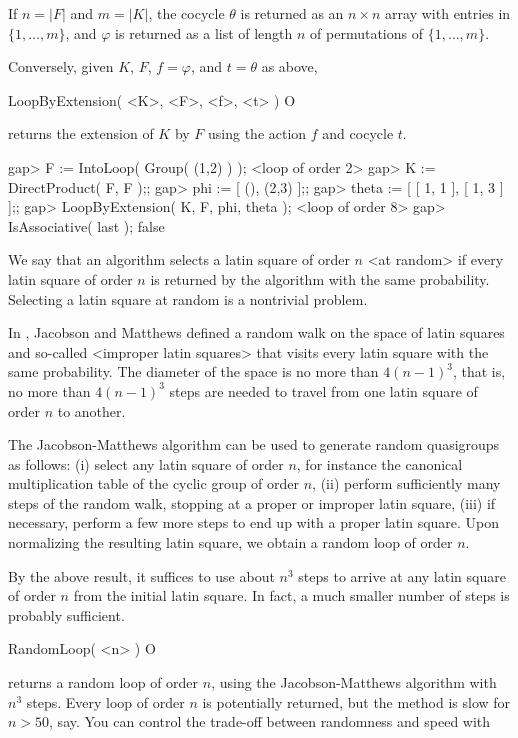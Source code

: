 If $n=|F|$ and $m=|K|$, the cocycle $\theta$ is returned as an $n\times n$
array with entries in $\{1,\dots,m\}$, and $\varphi$ is returned as a list of
length $n$ of permutations of $\{1,\dots,m\}$.

Conversely, given $K$, $F$, $f = \varphi$, and $t = \theta$ as above,

\>LoopByExtension( <K>, <F>, <f>, <t> ) O

returns the extension of $K$ by $F$ using the action $f$ and cocycle $t$.

\beginexample
gap> F := IntoLoop( Group( (1,2) ) );
<loop of order 2>
gap> K := DirectProduct( F, F );;
gap> phi := [ (), (2,3) ];;
gap> theta := [ [ 1, 1 ], [ 1, 3 ] ];;
gap> LoopByExtension( K, F, phi, theta );
<loop of order 8>
gap> IsAssociative( last );
false
\endexample


We say that an algorithm selects a latin square of order $n$ <at
random>\label{random!Latin square} if every latin
square of order $n$ is returned by the algorithm with the same probability.
Selecting a latin square at random is a nontrivial problem.

In \cite{JaMa}, Jacobson and Matthews defined a random walk on the space of
latin squares and so-called <improper latin squares> that visits every latin
square with the same probability. The diameter of the space is no more than
$4(n-1)^3$, that is, no more than $4(n-1)^3$ steps are needed to travel from
one latin square of order $n$ to another.

The Jacobson-Matthews algorithm can be used to generate random quasigroups as
follows: (i) select any latin square of order $n$, for instance the canonical
multiplication table of the cyclic group of order $n$, (ii) perform
sufficiently many steps of the random walk, stopping at a proper or improper
latin square, (iii) if necessary, perform a few more steps to end up with a
proper latin square. Upon normalizing the resulting latin square, we obtain a
random loop of order $n$.

By the above result, it suffices to use about $n^3$ steps to arrive at any
latin square of order $n$ from the initial latin square. In fact, a much
smaller number of steps is probably
sufficient.

\>RandomLoop( <n> ) O

returns a random loop of order $n$, using the Jacobson-Matthews algorithm with
$n^3$ steps. Every loop of order $n$ is potentially returned, but the method is
slow for $n>50$, say. You can control the trade-off between randomness and speed with

